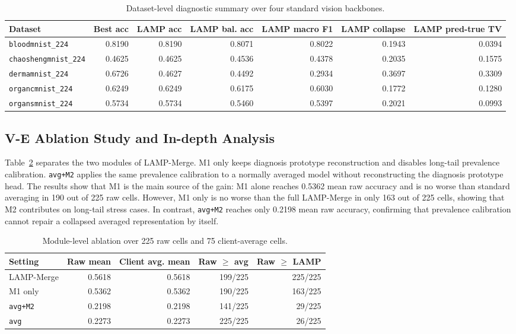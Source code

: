 \begin{table}[t]
\centering
\caption{Dataset-level diagnostic summary over four standard vision backbones.}
\label{tab:dataset-summary}
\small
\begin{tabular}{lrrrrrr}
\hline
Dataset & Best acc & LAMP acc & LAMP bal. acc & LAMP macro F1 & LAMP collapse & LAMP pred-true TV \\
\hline
\texttt{bloodmnist\_224} & 0.8190 & 0.8190 & 0.8071 & 0.8022 & 0.1943 & 0.0394 \\
\texttt{chaoshengmnist\_224} & 0.4625 & 0.4625 & 0.4536 & 0.4378 & 0.2035 & 0.1575 \\
\texttt{dermamnist\_224} & 0.6726 & 0.4627 & 0.4492 & 0.2934 & 0.3697 & 0.3309 \\
\texttt{organcmnist\_224} & 0.6249 & 0.6249 & 0.6175 & 0.6030 & 0.1772 & 0.1280 \\
\texttt{organsmnist\_224} & 0.5734 & 0.5734 & 0.5460 & 0.5397 & 0.2021 & 0.0993 \\
\hline
\end{tabular}
\end{table}

\subsection{V-E Ablation Study and In-depth Analysis}
Table~\ref{tab:module-ablation} separates the two modules of LAMP-Merge. M1 only keeps diagnosis prototype reconstruction and disables long-tail prevalence calibration. \texttt{avg+M2} applies the same prevalence calibration to a normally averaged model without reconstructing the diagnosis prototype head. The results show that M1 is the main source of the gain: M1 alone reaches 0.5362 mean raw accuracy and is no worse than standard averaging in 190 out of 225 raw cells. However, M1 only is no worse than the full LAMP-Merge in only 163 out of 225 cells, showing that M2 contributes on long-tail stress cases. In contrast, \texttt{avg+M2} reaches only 0.2198 mean raw accuracy, confirming that prevalence calibration cannot repair a collapsed averaged representation by itself.

\begin{table}[t]
\centering
\caption{Module-level ablation over 225 raw cells and 75 client-average cells.}
\label{tab:module-ablation}
\small
\begin{tabular}{lrrrr}
\hline
Setting & Raw mean & Client avg. mean & Raw $\ge$ avg & Raw $\ge$ LAMP \\
\hline
LAMP-Merge & 0.5618 & 0.5618 & 199/225 & 225/225 \\
M1 only & 0.5362 & 0.5362 & 190/225 & 163/225 \\
\texttt{avg+M2} & 0.2198 & 0.2198 & 141/225 & 29/225 \\
\texttt{avg} & 0.2273 & 0.2273 & 225/225 & 26/225 \\
\hline
\end{tabular}
\end{table}

